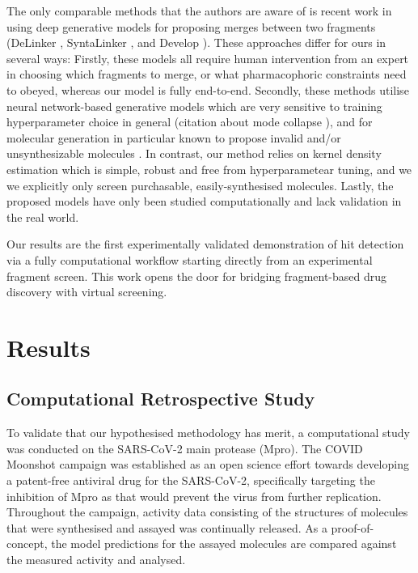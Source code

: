 The only comparable methods that the authors are aware of is recent work in using deep generative models for proposing merges between two fragments (DeLinker \cite{Imrie2020DeLinker}, SyntaLinker \cite{Yang2020SyntaLinker}, and Develop \cite{Imrie2021Develop}). These approaches differ for ours in several ways: Firstly, these models all require human intervention from an expert in choosing which fragments to merge, or what pharmacophoric constraints need to obeyed, whereas our model is fully end-to-end. Secondly, these methods utilise neural network-based generative models which are very sensitive to training hyperparameter choice in general (citation about mode collapse \cite{?}), and for molecular generation in particular known to propose invalid and/or unsynthesizable molecules \cite{Gao2020Synthesizability}. In contrast, our method relies on kernel density estimation which is simple, robust and free from hyperparametear tuning, and we we explicitly only screen purchasable, easily-synthesised molecules. Lastly, the proposed models have only been studied computationally and lack validation in the real world.

Our results are the first experimentally validated demonstration of hit detection via a fully computational workflow starting directly from an experimental fragment screen. This work opens the door for bridging fragment-based drug discovery with virtual screening.

\section{Results}


\subsection{Computational Retrospective Study}

To validate that our hypothesised methodology has merit, a computational study was conducted on the SARS-CoV-2 main protease (Mpro). The COVID Moonshot campaign \cite{Moonshot2022} was established as an open science effort towards developing a patent-free antiviral drug for the SARS-CoV-2, specifically targeting the inhibition of Mpro as that would prevent the virus from further replication. Throughout the campaign, activity data consisting of the structures of molecules that were synthesised and assayed was continually released. As a proof-of-concept, the model predictions for the assayed molecules are compared against the measured activity and analysed.

